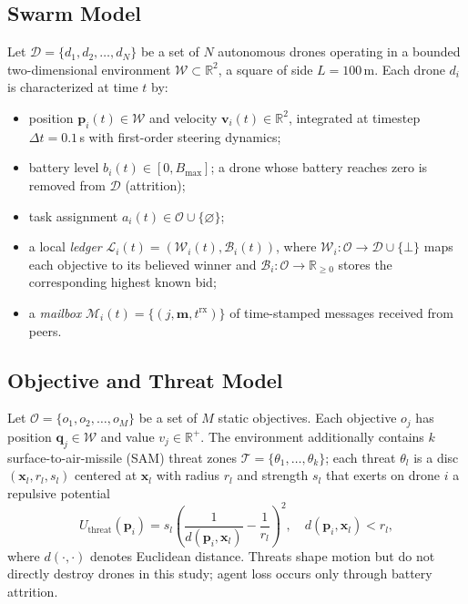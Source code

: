 \subsection{Swarm Model}\label{sec:swarm-model}
Let $\mathcal{D} = \{d_1, d_2, \ldots, d_N\}$ be a set of $N$ autonomous drones operating in a bounded two-dimensional environment $\mathcal{W} \subset \mathbb{R}^2$, a square of side $L = 100$\,m.
Each drone $d_i$ is characterized at time $t$ by:
\begin{itemize}
    \item position $\mathbf{p}_i(t) \in \mathcal{W}$ and velocity $\mathbf{v}_i(t) \in \mathbb{R}^2$, integrated at timestep $\Delta t = 0.1$\,s with first-order steering dynamics;
    \item battery level $b_i(t) \in [0, B_{\max}]$; a drone whose battery reaches zero is removed from $\mathcal{D}$ (attrition);
    \item task assignment $a_i(t) \in \mathcal{O} \cup \{\varnothing\}$;
    \item a local \emph{ledger} $\mathcal{L}_i(t) = (\mathcal{W}_i(t), \mathcal{B}_i(t))$, where $\mathcal{W}_i: \mathcal{O} \to \mathcal{D} \cup \{\bot\}$ maps each objective to its believed winner and $\mathcal{B}_i: \mathcal{O} \to \mathbb{R}_{\geq 0}$ stores the corresponding highest known bid;
    \item a \emph{mailbox} $\mathcal{M}_i(t) = \{(j, \mathbf{m}, t^{\mathrm{rx}})\}$ of time-stamped messages received from peers.
\end{itemize}

\subsection{Objective and Threat Model}\label{sec:objective-model}
Let $\mathcal{O} = \{o_1, o_2, \ldots, o_M\}$ be a set of $M$ static objectives.
Each objective $o_j$ has position $\mathbf{q}_j \in \mathcal{W}$ and value $v_j \in \mathbb{R}^{+}$.
The environment additionally contains $k$ surface-to-air-missile (SAM) threat zones $\mathcal{T} = \{\theta_1, \ldots, \theta_k\}$; each threat $\theta_l$ is a disc $(\mathbf{x}_l, r_l, s_l)$ centered at $\mathbf{x}_l$ with radius $r_l$ and strength $s_l$ that exerts on drone $i$ a repulsive potential
\begin{equation}
    U_{\mathrm{threat}}(\mathbf{p}_i) = s_l \left( \frac{1}{d(\mathbf{p}_i, \mathbf{x}_l)} - \frac{1}{r_l} \right)^{2}, \quad d(\mathbf{p}_i, \mathbf{x}_l) < r_l,
    \label{eq:threat-potential}
\end{equation}
where $d(\cdot,\cdot)$ denotes Euclidean distance.
Threats shape motion but do not directly destroy drones in this study; agent loss occurs only through battery attrition.

